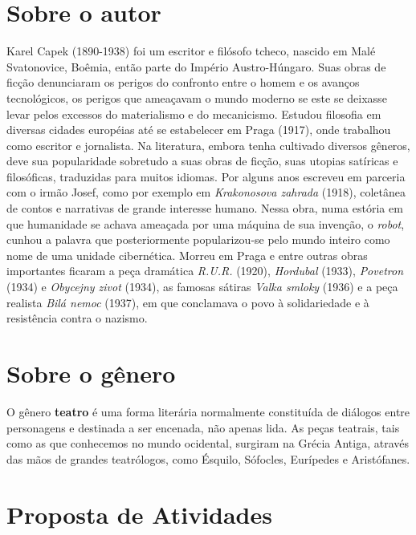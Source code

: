 \documentclass[11pt]{extarticle}
\begin{document}

\section{Sobre o autor}

Karel Capek (1890-1938) foi um escritor e filósofo tcheco, nascido em Malé Svatonovice, Boêmia, então parte do Império Austro-Húngaro. Suas obras de ficção denunciaram os perigos do confronto entre o homem e os avanços tecnológicos, os perigos que ameaçavam o mundo moderno se este se deixasse levar pelos excessos do materialismo e do mecanicismo. Estudou filosofia em diversas cidades européias até se estabelecer em Praga (1917), onde trabalhou como escritor e jornalista. Na literatura, embora tenha cultivado diversos gêneros, deve sua popularidade sobretudo a suas obras de ficção, suas utopias satíricas e filosóficas, traduzidas para muitos idiomas. Por alguns anos escreveu em parceria com o irmão Josef, como por exemplo em \textit{Krakonosova zahrada} (1918), coletânea de contos e narrativas de grande interesse humano. Nessa obra, numa estória em que humanidade se achava ameaçada por uma máquina de sua invenção, o \textit{robot}, cunhou a palavra que posteriormente popularizou-se pelo mundo inteiro como nome de uma unidade cibernética. Morreu em Praga e entre outras obras importantes ficaram a peça dramática \textit{R.U.R.} (1920), \textit{Hordubal} (1933), \textit{Povetron} (1934) e \textit{Obycejny zivot} (1934), as famosas sátiras \textit{Valka smloky} (1936) e a peça realista \textit{Bilá nemoc} (1937), em que conclamava o povo à solidariedade e à resistência contra o nazismo.

\section{Sobre o gênero}

O gênero \textbf{teatro} é uma forma literária normalmente constituída de diálogos entre personagens e destinada a ser encenada, não apenas lida. As peças teatrais, tais como as que conhecemos no mundo ocidental, surgiram na Grécia Antiga, através das mãos de grandes teatrólogos, como Ésquilo, Sófocles, Eurípedes e Aristófanes.

\section{Proposta de Atividades}
\end{document}
